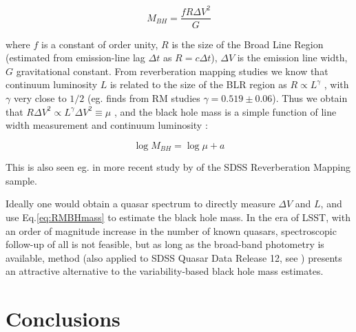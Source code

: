 \documentclass[twocolumn]{aastex62}
\begin{document}
\begin{equation}
M_{BH} = \frac{f R \Delta V^{2}}{G}
\end{equation}

where $f$ is a constant of order unity, $R$ is the size of the Broad Line Region (estimated from  emission-line lag $\Delta t$ as $R = c \Delta t$), $\Delta V$ is the emission line width, $G$ gravitational constant. From reverberation mapping studies we know that continuum luminosity $L$ is related to the size of the BLR region as $R \propto L^{\gamma}$ \citep{vestergaard2006}, with $\gamma$ very close to $1/2$ (eg. \citealt{bentz2009} finds from RM studies $\gamma = 0.519 \pm 0.06$). Thus we obtain  that $R \Delta V^{2} \propto L^{\gamma} \Delta V^{2} \equiv \mu$ , and the black hole mass is a simple function of line width measurement  and continuum luminosity : 

\begin{equation}
\label{eq:RMBHmass}
\log{M_{BH}} = \log{\mu} + a 
\end{equation}

This is also seen eg. in more recent study by \citep{shen2018} of the SDSS Reverberation Mapping sample. 

Ideally one would obtain a quasar spectrum to directly measure $\Delta V$ and $L$, and use Eq.\ref{eq:RMBHmass} to estimate the black hole mass. In the era of LSST, with an order of magnitude increase in the number of known quasars, spectroscopic follow-up of all is not feasible, but as long as the broad-band photometry is available, \citep{kozlowski2015} method (also applied to SDSS Quasar Data Release 12, see \citealt{kozlowski2017b}) presents an attractive alternative to the variability-based black hole mass estimates. 





%
%
%
%
%
%

\section{Conclusions}\label{sec:conclusions}





 


\end{document}
